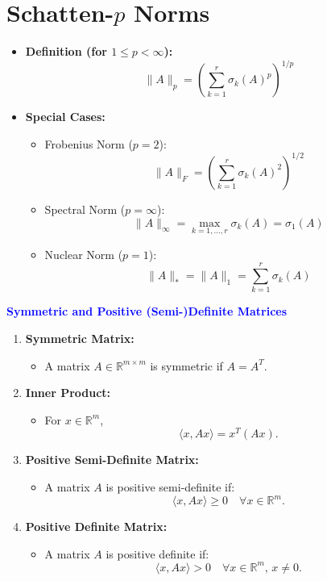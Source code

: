 \documentclass{article}
\begin{document}
\section*{Schatten-$p$ Norms}
\begin{itemize}
    \item \textbf{Definition (for $1 \leq p < \infty$):}
    \[
    \|A\|_p = \left( \sum_{k=1}^r \sigma_k(A)^p \right)^{1/p}
    \]

    \item \textbf{Special Cases:}
    \begin{itemize}
        \item Frobenius Norm ($p = 2$):
        \[
        \|A\|_F = \left( \sum_{k=1}^r \sigma_k(A)^2 \right)^{1/2}
        \]

        \item Spectral Norm ($p = \infty$):
        \[
        \|A\|_\infty = \max_{k=1,\ldots,r} \sigma_k(A) = \sigma_1(A)
        \]

        \item Nuclear Norm ($p = 1$):
        \[
        \|A\|_* = \|A\|_1 = \sum_{k=1}^r \sigma_k(A)
        \]
    \end{itemize}
\end{itemize}












\noindent\textbf{\textcolor{blue}{Symmetric and Positive (Semi-)Definite Matrices}}

\begin{enumerate}
    \item \textbf{Symmetric Matrix:}
    \begin{itemize}
        \item A matrix $A \in \mathbb{R}^{m \times m}$ is symmetric if $A = A^T$.
    \end{itemize}

    \item \textbf{Inner Product:}
    \begin{itemize}
        \item For $x \in \mathbb{R}^m$, 
        \[
        \langle x, Ax \rangle = x^T(Ax).
        \]
    \end{itemize}

    \item \textbf{Positive Semi-Definite Matrix:}
    \begin{itemize}
        \item A matrix $A$ is positive semi-definite if:
        \[
        \langle x, Ax \rangle \geq 0 \quad \forall x \in \mathbb{R}^m.
        \]
    \end{itemize}

    \item \textbf{Positive Definite Matrix:}
    \begin{itemize}
        \item A matrix $A$ is positive definite if:
        \[
        \langle x, Ax \rangle > 0 \quad \forall x \in \mathbb{R}^m, \, x \neq 0.
        \]
    \end{itemize}
\end{enumerate}
\end{document}
